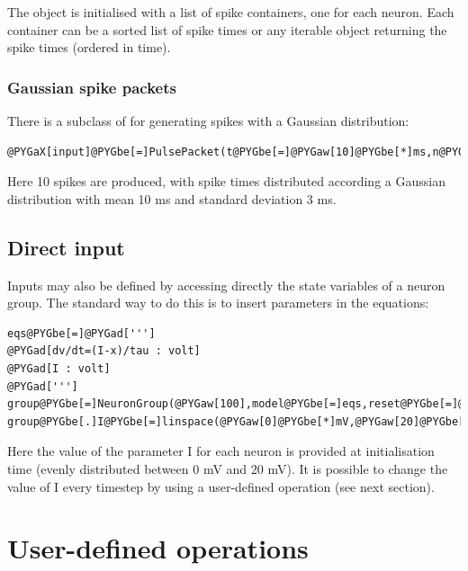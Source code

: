 \documentclass[letterpaper,10pt,english]{manual}
\begin{document}
The object is initialised with a list of spike containers, one for each neuron.
Each container can be a sorted list of spike times or any iterable object returning
the spike times (ordered in time).


\subsubsection{Gaussian spike packets}

There is a subclass of \hyperlink{brian.SpikeGeneratorGroup}{} for generating spikes with a Gaussian
distribution:

\begin{Verbatim}[commandchars=@\[\]]
@PYGaX[input]@PYGbe[=]PulsePacket(t@PYGbe[=]@PYGaw[10]@PYGbe[*]ms,n@PYGbe[=]@PYGaw[10],sigma@PYGbe[=]@PYGaw[3]@PYGbe[*]ms)
\end{Verbatim}

Here 10 spikes are produced, with spike times distributed according a Gaussian distribution with
mean 10 ms and standard deviation 3 ms.


\subsection{Direct input}

Inputs may also be defined by accessing directly the state variables of a neuron group. The standard way
to do this is to insert parameters in the equations:

\begin{Verbatim}[commandchars=@\[\]]
eqs@PYGbe[=]@PYGad[''']
@PYGad[dv/dt=(I-x)/tau : volt]
@PYGad[I : volt]
@PYGad[''']
group@PYGbe[=]NeuronGroup(@PYGaw[100],model@PYGbe[=]eqs,reset@PYGbe[=]@PYGaw[0]@PYGbe[*]mV,threshold@PYGbe[=]@PYGaw[15]@PYGbe[*]mV)
group@PYGbe[.]I@PYGbe[=]linspace(@PYGaw[0]@PYGbe[*]mV,@PYGaw[20]@PYGbe[*]mV,@PYGaw[100])
\end{Verbatim}

Here the value of the parameter I for each neuron is provided at initialisation time
(evenly distributed between 0 mV and 20 mV).
It is possible to change the value of I every timestep by using a user-defined operation (see next
section).

\resetcurrentobjects


\section{User-defined operations}
\end{document}
